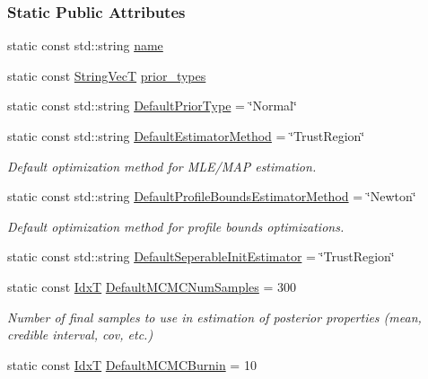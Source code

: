 \subsubsection*{Static Public Attributes}
\begin{DoxyCompactItemize}
\item 
static const std\+::string \hyperlink{classmappel_1_1Gauss2DMAP_ab108b36b4172e55b3e53cefb645199a6}{name}
\item 
static const \hyperlink{namespacemappel_aae88cf18bccfbb789a6019bcfbbfca68}{String\+VecT} \hyperlink{classmappel_1_1Gauss2DModel_a3bd9cb65f8d41f7b7707e3c4e1299dc2}{prior\+\_\+types}
\item 
static const std\+::string \hyperlink{classmappel_1_1Gauss2DModel_af4b934d290782da4f5f7e8e7e5090a94}{Default\+Prior\+Type} = \char`\"{}Normal\char`\"{}
\item 
static const std\+::string \hyperlink{classmappel_1_1PointEmitterModel_aa90f02cfd2af6acf4d8ba3bbfbe906e5}{Default\+Estimator\+Method} = \char`\"{}Trust\+Region\char`\"{}
\begin{DoxyCompactList}\small\item\em Default optimization method for M\+L\+E/\+M\+AP estimation. \end{DoxyCompactList}\item 
static const std\+::string \hyperlink{classmappel_1_1PointEmitterModel_a5240568f2d7c7bad84e900d283b299dc}{Default\+Profile\+Bounds\+Estimator\+Method} = \char`\"{}Newton\char`\"{}
\begin{DoxyCompactList}\small\item\em Default optimization method for profile bounds optimizations. \end{DoxyCompactList}\item 
static const std\+::string \hyperlink{classmappel_1_1PointEmitterModel_ad8c3dc629d75d22f25855a5f1ba8729f}{Default\+Seperable\+Init\+Estimator} = \char`\"{}Trust\+Region\char`\"{}
\item 
static const \hyperlink{namespacemappel_ab17ec0f30b61ece292439d7ece81d3a8}{IdxT} \hyperlink{classmappel_1_1PointEmitterModel_a9bbed2f2e91f1e5f0f4f9389cd2de333}{Default\+M\+C\+M\+C\+Num\+Samples} = 300
\begin{DoxyCompactList}\small\item\em Number of final samples to use in estimation of posterior properties (mean, credible interval, cov, etc.) \end{DoxyCompactList}\item 
static const \hyperlink{namespacemappel_ab17ec0f30b61ece292439d7ece81d3a8}{IdxT} \hyperlink{classmappel_1_1PointEmitterModel_a6fc96e398771a33d5586c2af10a2e6d8}{Default\+M\+C\+M\+C\+Burnin} = 10

\end{DoxyCompactItemize}
